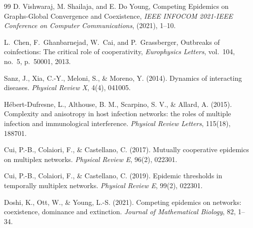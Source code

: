 \documentclass[a4paper,12pt]{scrartcl}
\theoremstyle{plain}%
\theoremstyle{definition}
\theoremstyle{remark}
\numberwithin{equation}{section}
\begin{document}
{\begin{thebibliography}{99}
  D. Vishwaraj, M. Shailaja, and E. Do Young,
  {Competing Epidemics on Graphs-Global Convergence and Coexistence},
  \emph{IEEE INFOCOM 2021-IEEE Conference on Computer Communications}, (2021), {1--10}.

L.~Chen, F.~Ghanbarnejad, W.~Cai, and P.~Grassberger,
Outbreaks of coinfections: The critical role of cooperativity,
\textit{Europhysics Letters}, vol.~104, no.~5, p.~50001, 2013.

Sanz, J., Xia, C.-Y., Meloni, S., \& Moreno, Y. (2014). 
Dynamics of interacting diseases. 
\textit{Physical Review X}, 4(4), 041005.

H{\'e}bert-Dufresne, L., Althouse, B. M., Scarpino, S. V., \& Allard, A. (2015). 
Complexity and anisotropy in host infection networks: the roles of multiple infection and immunological interference. 
\textit{Physical Review Letters}, 115(18), 188701.













Cui, P.-B., Colaiori, F., \& Castellano, C. (2017). 
Mutually cooperative epidemics on multiplex networks. 
\textit{Physical Review E}, 96(2), 022301.

Cui, P.-B., Colaiori, F., \& Castellano, C. (2019). 
Epidemic thresholds in temporally multiplex networks. 
\textit{Physical Review E}, 99(2), 022301.

Doshi, K., Ott, W., \& Young, L.-S. (2021). 
Competing epidemics on networks: coexistence, dominance and extinction. 
\textit{Journal of Mathematical Biology}, 82, 1--34.
\end{thebibliography}
}
\end{document}
